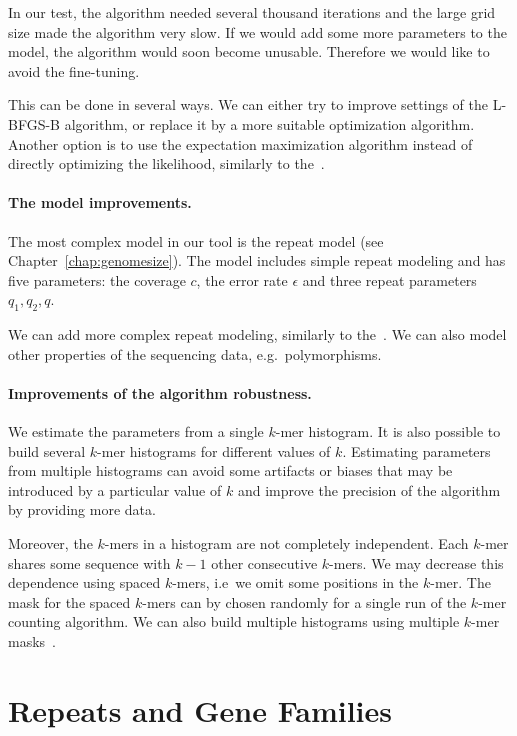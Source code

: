 In our test, the algorithm needed several thousand iterations and the large grid size made the algorithm very slow.
If we would add some more parameters to the model, the algorithm would soon become unusable. Therefore we would like to avoid the fine-tuning.

This can be done in several ways. We can either try to improve settings of the L-BFGS-B algorithm, or replace it by a more suitable optimization algorithm. Another option is to use the expectation maximization algorithm instead of directly optimizing the likelihood, similarly to the~\cite{waterman}.

\paragraph{The model improvements.}
The most complex model in our tool is the repeat model (see Chapter~\ref{chap:genomesize}). The model includes simple repeat modeling and has five parameters: the coverage $c$, the error rate $\epsilon$ and three repeat parameters $q_1, q_2, q$.

We can add more complex repeat modeling, similarly to the~\cite{williams}. We can also model other properties of the sequencing data, e.g.\ polymorphisms.

\paragraph{Improvements of the algorithm robustness.}

We estimate the parameters from a single $k$-mer histogram. It is also possible to build several $k$-mer histograms for different values of $k$. Estimating parameters from multiple histograms can avoid some artifacts or biases that may be introduced by a particular value of $k$ and improve the precision of the algorithm by providing more data.

Moreover, the $k$-mers in a histogram are not completely independent. Each $k$-mer shares some sequence with $k-1$ other consecutive $k$-mers. We may decrease this dependence using spaced $k$-mers, i.e\ we omit some positions in the $k$-mer.
The mask for the spaced $k$-mers can by chosen randomly for a single run of the $k$-mer counting algorithm. We can also build multiple histograms using multiple $k$-mer masks~\cite{keich2004spaced}.

\section{Repeats and Gene Families}\label{sect:repeats-families}

